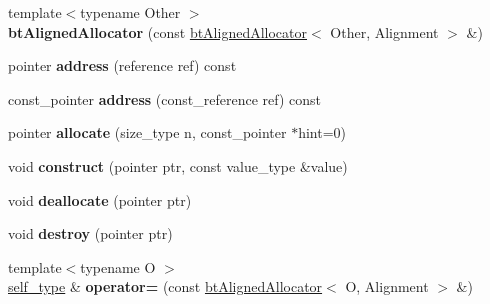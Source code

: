 \begin{DoxyCompactItemize}
\item 
\mbox{\label{classbtAlignedAllocator_a8b129ab9ee2c6b8f638714913f5ac7a6}} 
{\footnotesize template$<$typename Other $>$ }\\{\bfseries bt\+Aligned\+Allocator} (const \hyperlink{classbtAlignedAllocator}{bt\+Aligned\+Allocator}$<$ Other, Alignment $>$ \&)
\item 
\mbox{\label{classbtAlignedAllocator_adaf5f8601f0b27ec5fe962ba35e5b6ff}} 
pointer {\bfseries address} (reference ref) const
\item 
\mbox{\label{classbtAlignedAllocator_a85187907179eadeb9907902ba7ee371a}} 
const\+\_\+pointer {\bfseries address} (const\+\_\+reference ref) const
\item 
\mbox{\label{classbtAlignedAllocator_a5b14474126ff00cd364dfb74304ec6c3}} 
pointer {\bfseries allocate} (size\+\_\+type n, const\+\_\+pointer $\ast$hint=0)
\item 
\mbox{\label{classbtAlignedAllocator_afdb40058534d13fed3fddade2939bd8e}} 
void {\bfseries construct} (pointer ptr, const value\+\_\+type \&value)
\item 
\mbox{\label{classbtAlignedAllocator_a9aa2ce10c6b68eb249116f8712008724}} 
void {\bfseries deallocate} (pointer ptr)
\item 
\mbox{\label{classbtAlignedAllocator_a8570a358258bc64869f0effd8405b69b}} 
void {\bfseries destroy} (pointer ptr)
\item 
\mbox{\label{classbtAlignedAllocator_a5366e980346aa0b85befd8ffecdffb9d}} 
{\footnotesize template$<$typename O $>$ }\\\hyperlink{classbtAlignedAllocator}{self\+\_\+type} \& {\bfseries operator=} (const \hyperlink{classbtAlignedAllocator}{bt\+Aligned\+Allocator}$<$ O, Alignment $>$ \&)
\end{DoxyCompactItemize}
